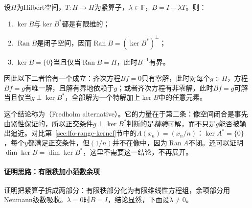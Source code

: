 \begin{theorem}[Fredholm二择定理]
\label{thm:ose-fredholm}
设$H$为Hilbert空间，$T:H\to H$为紧算子，$\lambda\in\mathbb F$，$B=I-\lambda T$。则：
\begin{enumerate}
  \item $\ker B$与$\ker B^*$都是有限维的；
  \item $\operatorname{Ran}B$是闭子空间，因而$\operatorname{Ran}B=(\ker B^*)^\perp$；
  \item $\ker B=\{0\}$当且仅当$\operatorname{Ran}B=H$，此时$B^{-1}$有界。
\end{enumerate}
因此以下二者恰有一个成立：齐次方程$Bf=0$只有零解，此时对每个$g\in H$，方程$Bf=g$有唯一解，且解有界地依赖于$g$；或者齐次方程有非零解，此时$Bf=g$可解当且仅当$g\perp\ker B^*$，全部解为一个特解加上$\ker B$中的任意元素。
\end{theorem}

这个结论称为（Fredholm alternative）。它的力量在于第二条：像空间闭合是事先由紧性保证的，所以正交条件$g\perp\ker B^*$判断的是\emph{精确}可解，而不只是$g$能否被输出逼近。对比第~\ref{sec:lfo-range-kernel}节中的$A(x_n)=(x_n/n)$：$\ker A^*=\{0\}$，每个$y$都满足正交条件，但$(1/n)$并不在像中，因为$\operatorname{Ran}A$不闭。还可以证明$\dim\ker B=\dim\ker B^*$，这里不需要这一结论，不再展开。

\paragraph{证明思路：有限秩加小范数余项}
证明把紧算子拆成两部分：有限秩部分化为有限维线性方程组，余项部分用Neumann级数吸收。$\lambda=0$时$B=I$，结论显然，下面设$\lambda\neq0$。

